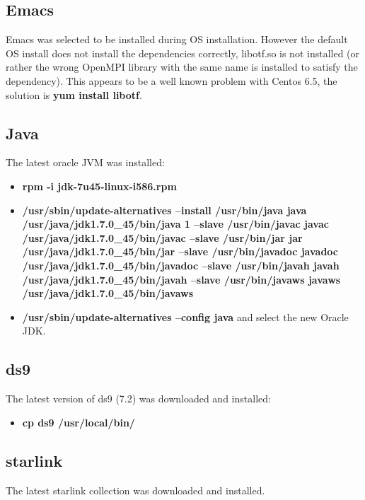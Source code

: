 \documentclass[10pt,a4paper]{article}
\begin{document}
\subsection{Emacs}

Emacs was selected to be installed during OS installation. However the default OS install does not install the dependencies correctly, libotf.so is not installed (or rather the wrong OpenMPI library with the same name is installed to satisfy the dependency). This appears to be a well known problem with Centos 6.5, the solution is {\bf yum install libotf}.

\subsection{Java}

The latest oracle JVM was installed: 

\begin{itemize}
\item {\bf rpm -i jdk-7u45-linux-i586.rpm}
\item {\bf/usr/sbin/update-alternatives --install /usr/bin/java java /usr/java/jdk1.7.0\_45/bin/java 1 --slave /usr/bin/javac javac /usr/java/jdk1.7.0\_45/bin/javac --slave /usr/bin/jar jar /usr/java/jdk1.7.0\_45/bin/jar --slave /usr/bin/javadoc javadoc /usr/java/jdk1.7.0\_45/bin/javadoc --slave /usr/bin/javah javah /usr/java/jdk1.7.0\_45/bin/javah --slave /usr/bin/javaws javaws /usr/java/jdk1.7.0\_45/bin/javaws}
\item {\bf/usr/sbin/update-alternatives --config java} and select the new Oracle JDK.
\end{itemize}

\subsection{ds9}

The latest version of ds9 (7.2) \cite{bib:ds9} was downloaded and installed:

\begin{itemize}
\item {\bf cp ds9 /usr/local/bin/}
\end{itemize}

\subsection{starlink}

The latest starlink collection was downloaded \cite{bib:starlink} and installed.
\end{document}
